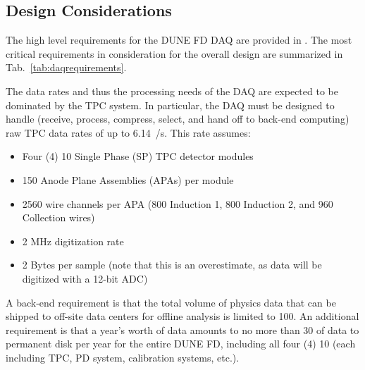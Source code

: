 
\subsection{Design Considerations}
\label{sec:fdsp-daq-des-consid}



The high level requirements for the DUNE FD DAQ are provided in
\cite{daq:reqs}.
The most critical requirements in consideration for the overall design
are summarized in Tab.~\ref{tab:daqrequirements}.

The data rates and thus the processing needs of the DAQ are expected
to be dominated by the TPC system.
In particular, the DAQ must be designed to handle (receive, process,
compress, select, and hand off to back-end computing) raw TPC data
rates of up to \SI{6.14}{\TB/\s}. 
This rate assumes:
\begin{itemize}
\item Four (4) \SI{10}{\kton} Single Phase (SP) TPC detector modules
\item 150 Anode Plane Assemblies (APAs) per module
\item 2560 wire channels per APA (800 Induction 1, 800 Induction 2, and 960 Collection wires)
\item 2 MHz digitization rate
\item 2 Bytes per sample (note that this is an overestimate, as data will be digitized with a 12-bit ADC)
\end{itemize}

A back-end requirement is that the total volume of physics data that
can be shipped to off-site data centers for offline analysis is
limited to \SI{100}{\Gbps}.
An additional requirement is that a year’s worth of data amounts to no
more than \SI{30}{\PB} of data to permanent disk per year for the
entire DUNE FD, including all four (4) \SI{10}{\kton}
 (each including TPC, PD system, calibration
systems, etc.).

